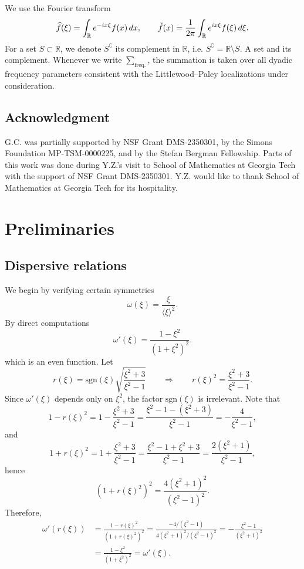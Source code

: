 \documentclass[reqno,english,11pt]{amsart}
\newcommand\R{\mathbb{R}}
\newcommand{\jxi}{\langle \xi \rangle}
\theoremstyle{definition}
\numberwithin{equation}{section}
\begin{document}
We use the Fourier transform
$$
\widehat{ f}(\xi)=\int_{\R}e^{-i x\xi}f(x)\,dx,
\qquad
\Check{f}(x)=\frac1{2\pi}\int_{\R}e^{i x\xi} f(\xi)\,d\xi.
$$
For a set $S\subset  \R$, we denote $S^\complement$ its complement in $\R$, i.e. $S^\complement=\R\setminus S.$
A set and its complement. Whenever we write $\sum_{\operatorname{freq.}}$, the summation is 
taken over all dyadic frequency parameters consistent with the Littlewood--Paley localizations under consideration.

\subsection{Acknowledgment}G.C. was partially supported by NSF Grant DMS-2350301, by the Simons Foundation MP-TSM-0000225, and by the Stefan Bergman Fellowship. 
Parts of this work was done during Y.Z.'s visit to School of Mathematics at Georgia Tech with the support of NSF Grant DMS-2350301.  Y.Z. would like to thank  School of Mathematics at Georgia Tech for its hospitality.
\section{Preliminaries}


\subsection{Dispersive relations}
We begin by verifying certain symmetries
\begin{equation}\label{eq:disperrelaton}
    \omega(\xi)=\frac{\xi}{\jxi^2}.
\end{equation} By direct computations
$$
\omega'(\xi)=\frac{1-\xi^{2}}{(1+\xi^{2})^{2}}.
$$
which is an even function.
Let
$$
r(\xi)=\mathrm{sgn}(\xi)\sqrt{\frac{\xi^{2}+3}{\xi^{2}-1}}
\qquad\Longrightarrow\qquad
r(\xi)^{2}=\frac{\xi^{2}+3}{\xi^{2}-1}.
$$
Since $\omega'(\xi)$ depends only on $\xi^{2}$, the factor $\mathrm{sgn}(\xi)$ is irrelevant. Note that
$$
1-r(\xi)^{2}
=1-\frac{\xi^{2}+3}{\xi^{2}-1}
=\frac{\xi^{2}-1-(\xi^{2}+3)}{\xi^{2}-1}
=-\frac{4}{\xi^{2}-1},
$$
and
$$
1+r(\xi)^{2}
=1+\frac{\xi^{2}+3}{\xi^{2}-1}
=\frac{\xi^{2}-1+\xi^{2}+3}{\xi^{2}-1}
=\frac{2(\xi^{2}+1)}{\xi^{2}-1},
$$
hence
$$
(1+r(\xi)^{2})^{2}=\frac{4(\xi^{2}+1)^{2}}{(\xi^{2}-1)^{2}}.
$$
Therefore,
\begin{align}\label{eq:omegarsym}
\omega'(r(\xi))
&=\frac{1-r(\xi)^{2}}{(1+r(\xi)^{2})^{2}}
=\frac{-4/(\xi^{2}-1)}{4(\xi^{2}+1)^{2}/(\xi^{2}-1)^{2}}
=-\frac{\xi^{2}-1}{(\xi^{2}+1)^{2}} \\
&=\frac{1-\xi^{2}}{(1+\xi^{2})^{2}}
=\omega'(\xi).
\end{align}
\end{document}
